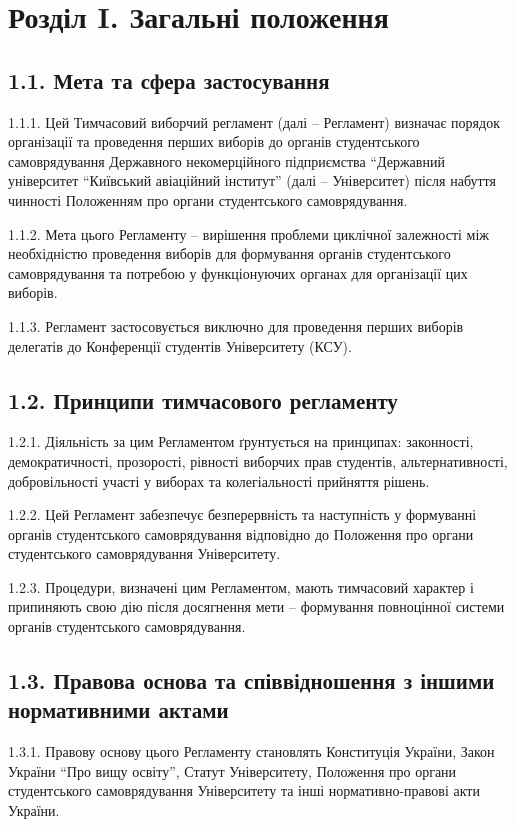 \section*{Розділ I. Загальні положення}

\subsection*{1.1. Мета та сфера застосування}
    1.1.1. Цей Тимчасовий виборчий регламент (далі -- Регламент) визначає порядок організації та проведення перших виборів до органів студентського самоврядування Державного некомерційного підприємства ``Державний університет ``Київський авіаційний інститут'' (далі -- Університет) після набуття чинності Положенням про органи студентського самоврядування.

    1.1.2. Мета цього Регламенту -- вирішення проблеми циклічної залежності між необхідністю проведення виборів для формування органів студентського самоврядування та потребою у функціонуючих органах для організації цих виборів.

    1.1.3. Регламент застосовується виключно для проведення перших виборів делегатів до Конференції студентів Університету (КСУ).

\subsection*{1.2. Принципи тимчасового регламенту}
    1.2.1. Діяльність за цим Регламентом ґрунтується на принципах: законності, демократичності, прозорості, рівності виборчих прав студентів, альтернативності, добровільності участі у виборах та колегіальності прийняття рішень.

    1.2.2. Цей Регламент забезпечує безперервність та наступність у формуванні органів студентського самоврядування відповідно до Положення про органи студентського самоврядування Університету.

    1.2.3. Процедури, визначені цим Регламентом, мають тимчасовий характер і припиняють свою дію після досягнення мети -- формування повноцінної системи органів студентського самоврядування.

\subsection*{1.3. Правова основа та співвідношення з іншими нормативними актами}
    1.3.1. Правову основу цього Регламенту становлять Конституція України, Закон України ``Про вищу освіту'', Статут Університету, Положення про органи студентського самоврядування Університету та інші нормативно-правові акти України.

